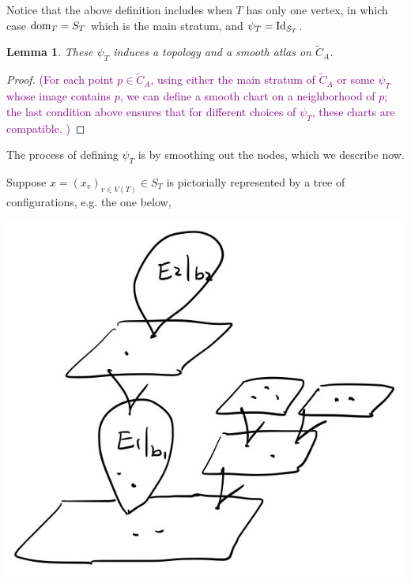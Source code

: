 \documentclass[11pt]{article}
\newtheorem{lmm}[thm]{Lemma}
\theoremstyle{definition}
\theoremstyle{remark}
\def\wt#1{\widetilde{#1}}
\def\dom{{\tn{dom}}}
\def\cmt#1{\textcolor{purple}{(#1)}}
\def\tn#1{\textnormal{#1}}
\begin{document}
Notice that the above definition includes when $T$ has only one vertex, in which case $\dom_T=S_T$ which is the main stratum, and $\psi_T=\tn{Id}_{S_T}$. 
  
\begin{lmm} 
These $\psi_T$ induces a topology and a smooth atlas on $\wt{C}_A$. 
\end{lmm}

\begin{proof}
\cmt{For each point $p\in\wt{C}_A$, using either the main stratum of $\wt{C}_A$ or some $\psi_T$ whose image contains $p$, we can define a smooth chart on a neighborhood of $p$; the last condition above ensures that for different choices of $\psi_T$, these charts are compatible. }
\end{proof}

The process of defining $\psi_T$ is by smoothing out the nodes, which we describe now. 

Suppose $x=(x_v)_{v\in V(T)}\in S_T$ is pictorially represented by a tree of configurations, e.g. the one below, 

\includegraphics[scale=0.15]{x_fig}
\end{document}
